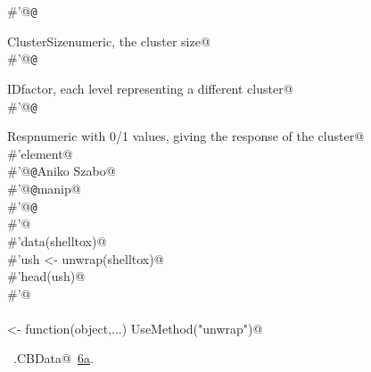 \documentclass[reqno]{amsart}
\renewcommand{\NWlink}[2]{\hyperlink{#1}{#2}}
\begin{document}
\begin{flushleft}
\begin{list}{}{}
\mbox{}\verb@#'@{\tt @}\verb@return \item{ClusterSize}{numeric, the cluster size}@\\
\mbox{}\verb@#'@{\tt @}\verb@return \item{ID}{factor, each level representing a different cluster}@\\
\mbox{}\verb@#'@{\tt @}\verb@return \item{Resp}{numeric with 0/1 values, giving the response of the cluster@\\
\mbox{}\verb@#'element}@\\
\mbox{}\verb@#'@{\tt @}\verb@author Aniko Szabo@\\
\mbox{}\verb@#'@{\tt @}\verb@keywords manip@\\
\mbox{}\verb@#'@{\tt @}\verb@examples@\\
\mbox{}\verb@#'@\\
\mbox{}\verb@#'data(shelltox)@\\
\mbox{}\verb@#'ush <- unwrap(shelltox)@\\
\mbox{}\verb@#'head(ush)@\\
\mbox{}\verb@#'@\\
\mbox{}\verb@@\\
\mbox{}\verb@unwrap <- function(object,...) UseMethod("unwrap")@\\
\mbox{}\verb@@{\NWsep}
\end{list}
\vspace{-1.5ex}
\footnotesize
\begin{list}{}{\setlength{\itemsep}{-\parsep}\setlength{\itemindent}{-\leftmargin}}
\item \NWtxtIdentsUsed\nobreak\  \verb@unwrap.CBData@\nobreak\ \NWlink{nuweb6a}{6a}.
\item{}
\end{list}
\vspace{4ex}
\end{flushleft}
\end{document}
